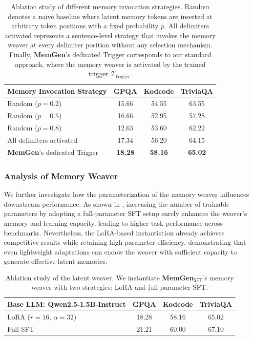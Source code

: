 \documentclass[]{fairmeta}
\newcommand{\ourmethod}{{\fontfamily{lmtt}\selectfont \textbf{MemGen}}\xspace}
\begin{document}
\begin{table}[!h]
\centering
\caption{Ablation study of different memory invocation strategies. {Random} denotes a naïve baseline where latent memory tokens are inserted at arbitrary token positions with a fixed probability $p$. {All delimiters activated} represents a sentence-level strategy that invokes the memory weaver at every delimiter position without any selection mechanism. Finally, {\ourmethod's dedicated Trigger} corresponds to our standard approach, where the memory weaver is activated by the trained trigger $\mathcal{T}_\text{trigger}$.}
\label{tab:ablation-trigger}
\small
\setlength{\tabcolsep}{10pt}
\renewcommand{\arraystretch}{1.2}
\begin{tabular}{lccc}
\toprule
\textbf{Memory Invocation Strategy} & \textbf{GPQA} & \textbf{Kodcode} & \textbf{TriviaQA} \\
\midrule
Random ($p=0.2$) & 15.66 & 54.55 & 63.55 \\
Random ($p=0.5$) & 16.66 & 52.95 & 57.28 \\
Random ($p=0.8$)& 12.63 & 53.60 & 62.22 \\
All delimiters activated & 17.34 & 56.20 & 64.15 \\
\ourmethod's dedicated Trigger & \textbf{18.28} & \textbf{58.16} & \textbf{65.02} \\
\bottomrule
\end{tabular}
\end{table}





\subsubsection{Analysis of Memory Weaver} 

We further investigate how the parameterization of the memory weaver influences downstream performance. As shown in , increasing the number of trainable parameters by adopting a full-parameter SFT setup surely enhances the weaver’s memory and learning capacity, leading to higher task performance across benchmarks. Nevertheless, the LoRA-based instantiation already achieves competitive results while retaining high parameter efficiency, demonstrating that even lightweight adaptations can endow the weaver with sufficient capacity to generate effective latent memories.


\begin{table}[!htbp]
\centering
\caption{Ablation study of the latent weaver. We instantiate \ourmethod$_\mathsf{SFT}$'s memory weaver with two strategies: LoRA and full-parameter SFT.}
\label{tab:sft-lora}
\small
\setlength{\tabcolsep}{8pt}
\renewcommand{\arraystretch}{1.3}
\begin{tabular}{lccc}
\toprule
Base LLM: \textbf{Qwen2.5-1.5B-Instruct} & GPQA & Kodcode & TriviaQA \\
\midrule
LoRA ($r=16$, $\alpha=32$) & 18.28 & 58.16 & 65.02 \\
Full SFT          & 21.21 &  60.00       & 67.10 \\
\bottomrule
\end{tabular}
\end{table}
\end{document}
